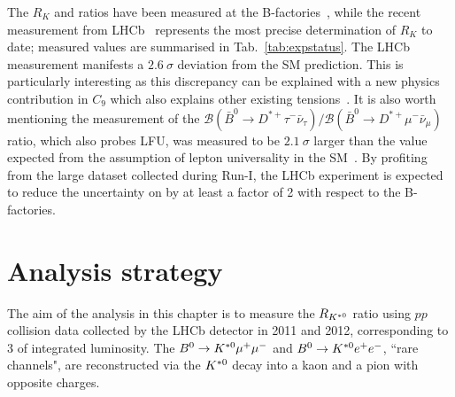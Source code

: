 The $R_K$ and \RKst ratios have been measured at the B-factories~\cite{Lees:2012tva,Wei:2009zv},
while the recent measurement from LHCb~\cite{Aaij:2014ora} represents the most precise determination 
of $R_K$ to date; measured values are summarised in Tab.~\ref{tab:expstatus}.
The LHCb measurement manifests a $2.6~\sigma$ deviation from the SM prediction. This is particularly interesting as this
discrepancy can be explained with a new physics contribution in $C_9$ which also explains other existing tensions~\cite{Altmannshofer:2014rta,Descotes-Genon:2013wba,Hurth:2016fbr}.
It is also worth mentioning the measurement of the 
\mbox{$\mathcal{B}(\bar{B}^0 \to D^{*+}\tau^{-}\bar{\nu}_{\tau})/\mathcal{B}(\bar{B}^0 \to D^{*+}\mu^{-}\bar{\nu}_{\mu})$} 
ratio, which also probes LFU, was measured to be $2.1~\sigma$ larger than the value expected from the assumption 
of lepton universality in the SM~\cite{Aaij:2015yra}.
By profiting from the large dataset collected during Run-I, the LHCb experiment is expected 
to reduce the uncertainty on \RKst by at least a factor of 2 with respect to the B-factories.
%
\begin{table}[b]
\renewcommand\arraystretch{1.5}
\centering
\caption{Experimental status of the $R_{K^{(*)}}$ measurements. } %
\label{tab:expstatus}
\end{table}
\clearpage

\section{Analysis strategy}

The aim of the analysis in this chapter is to measure the $R_{{{K}^{*0}}}$ ratio using $pp$ collision data
collected by the LHCb detector in 2011 and 2012, corresponding to 3 \invfb of integrated luminosity.
The ${{B}^0} \rightarrow {\ensuremath{{K}^{*0}}}{\ensuremath{\mu^+\mu^-}}$ and ${{B}^0} \rightarrow {\ensuremath{{K}^{*0}}}{\ensuremath{e^+e^-}}$, ``rare channels", are
reconstructed via the ${{K}^{*0}}$ decay into a kaon and a pion with opposite charges.

